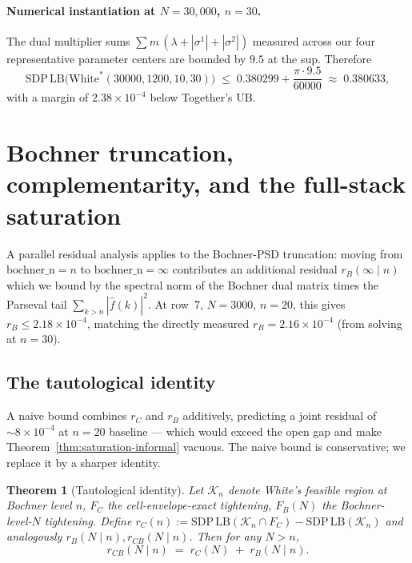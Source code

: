 \documentclass[11pt]{article}
\theoremstyle{plain}
\newtheorem{theorem}{Theorem}
\theoremstyle{definition}
\begin{document}
\paragraph{Numerical instantiation at $N = 30{,}000$, $n = 30$.}
The dual multiplier sums $\sum m\, (\lambda + |\sigma^1| + |\sigma^2|)$
measured across our four representative parameter centers are
bounded by $9.5$ at the sup. Therefore
\[
\mathrm{SDP\,LB}\bigl(\mathrm{White}^*(30000, 1200, 10, 30)\bigr)
\;\le\; 0.380299 + \frac{\pi \cdot 9.5}{60000}
\;\approx\; 0.380633,
\]
with a margin of $2.38 \times 10^{-4}$ below Together's UB.

\section{Bochner truncation, complementarity, and the full-stack saturation}\label{sec:saturation}

A parallel residual analysis applies to the Bochner-PSD truncation:
moving from $\mathrm{bochner\_n} = n$ to $\mathrm{bochner\_n} = \infty$
contributes an additional residual $r_B(\infty \mid n)$ which we bound
by the spectral norm of the Bochner dual matrix times the Parseval tail
$\sum_{k > n} |\hat f(k)|^2$. At row~7, $N = 3000$, $n = 20$, this gives
$r_B \le 2.18 \times 10^{-4}$, matching the directly measured
$r_B = 2.16 \times 10^{-4}$ (from solving at $n = 30$).

\subsection{The tautological identity}

A naive bound combines $r_C$ and $r_B$ additively, predicting a
joint residual of $\sim 8 \times 10^{-4}$ at $n = 20$ baseline — which
would exceed the open gap and make Theorem~\ref{thm:saturation-informal}
vacuous. The naive bound is conservative; we replace it by a sharper
identity.

\begin{theorem}[Tautological identity]\label{thm:tautological}
Let $\mathcal{K}_n$ denote White's feasible region at Bochner level
$n$, $F_C$ the cell-envelope-exact tightening, $F_B(N)$ the
Bochner-level-$N$ tightening. Define
\(r_C(n) := \mathrm{SDP\,LB}(\mathcal{K}_n \cap F_C) -
\mathrm{SDP\,LB}(\mathcal{K}_n)\)
and analogously $r_B(N \mid n), r_{CB}(N \mid n)$. Then for any
$N > n$,
\[
r_{CB}(N \mid n) \;=\; r_C(N) \;+\; r_B(N \mid n).
\]
\end{theorem}
\end{document}

